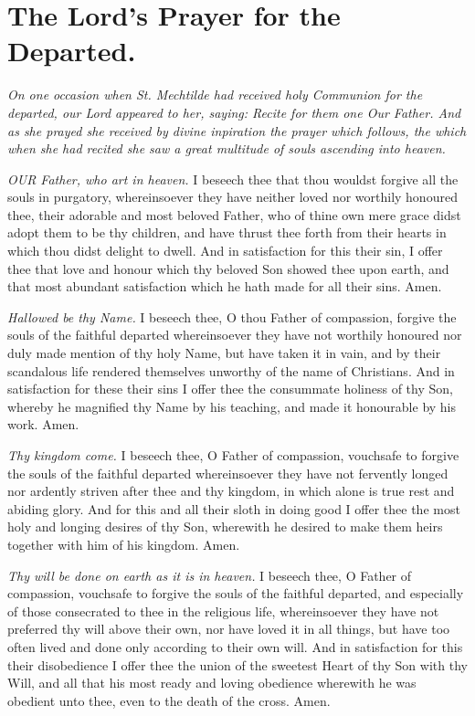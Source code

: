 \documentclass[a5paper,12pt]{memoir}
\begin{document}
\section{The Lord's Prayer for the Departed.}

\emph{On one occasion when 
St. Mechtilde had received holy Communion 
for the departed, our 
Lord appeared to her, 
saying: Recite for them 
one \emph{Our Father}. And 
as she prayed she received by divine inpiration the prayer which 
follows, the which when 
she had recited she saw 
a great multitude of 
souls ascending into 
heaven.} 

\emph{OUR Father, who art in heaven.} I 
beseech thee that 
thou wouldst forgive 
all the souls in purgatory, whereinsoever 
they have neither loved 
nor worthily honoured thee, their adorable 
and most beloved Father, who of thine 
own mere grace didst 
adopt them to be thy 
children, and have 
thrust thee forth from 
their hearts in which 
thou didst delight to 
dwell. And in satisfaction for this their 
sin, I offer thee that 
love and honour which 
thy beloved Son showed thee upon earth, 
and that most abundant satisfaction which 
he hath made for all 
their sins. Amen. 

\emph{Hallowed be thy 
Name.} I beseech 
thee, O thou Father 
of compassion, forgive 
the souls of the faithful departed whereinsoever they have not 
worthily honoured nor 
duly made mention of 
thy holy Name, but 
have taken it in vain, 
and by their scandalous life rendered 
themselves unworthy 
of the name of Christians. And in satisfaction for these their 
sins I offer thee the 
consummate holiness 
of thy Son, whereby he 
magnified thy Name 
by his teaching, and 
made it honourable by 
his work. Amen. 

\emph{Thy kingdom come.}
I beseech thee, O Father of compassion, 
vouchsafe to forgive 
the souls of the faithful departed whereinsoever they have not 
fervently longed nor 
ardently striven after 
thee and thy kingdom, in which alone 
is true rest and abiding glory. And for 
this and all their sloth 
in doing good I offer 
thee the most holy 
and longing desires 
of thy Son, wherewith 
he desired to make 
them heirs together 
with him of his kingdom. Amen. 

\emph{Thy will be done on 
earth as it is in heaven.} I beseech thee, 
O Father of compassion, vouchsafe to forgive the souls of the 
faithful departed, and 
especially of those 
consecrated to thee 
in the religious life, 
whereinsoever they 
have not preferred thy 
will above their own, 
nor have loved it in 
all things, but have 
too often lived and 
done only according to 
their own will. And 
in satisfaction for this 
their disobedience I 
offer thee the union 
of the sweetest Heart 
of thy Son with thy 
Will, and all that his 
most ready and loving obedience wherewith he was obedient 
unto thee, even to the 
death of the cross. 
Amen. 
\end{document}
